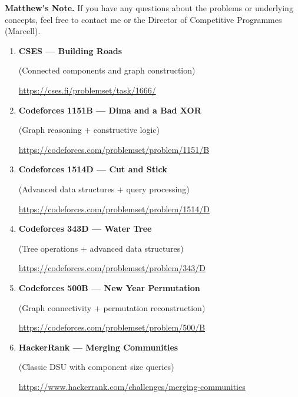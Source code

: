 \documentclass[11pt]{article}
\begin{document}
\medskip

\textbf{Matthew's Note.}  
If you have any questions about the problems or underlying concepts, feel free to contact me or the Director of Competitive Programmes (Marcell).

\vspace{0.8em}

\begin{enumerate}

\item \textbf{CSES — Building Roads}

(Connected components and graph construction)

\vspace{0.3em}
{\small\url{https://cses.fi/problemset/task/1666/}}

\vspace{0.8em}

\item \textbf{Codeforces 1151B — Dima and a Bad XOR}

(Graph reasoning + constructive logic)

\vspace{0.3em}
{\small\url{https://codeforces.com/problemset/problem/1151/B}}

\vspace{0.8em}

\item \textbf{Codeforces 1514D — Cut and Stick}

(Advanced data structures + query processing)

\vspace{0.3em}
{\small\url{https://codeforces.com/problemset/problem/1514/D}}

\vspace{0.8em}

\item \textbf{Codeforces 343D — Water Tree}

(Tree operations + advanced data structures)

\vspace{0.3em}
{\small\url{https://codeforces.com/problemset/problem/343/D}}

\vspace{0.8em}

\item \textbf{Codeforces 500B — New Year Permutation}

(Graph connectivity + permutation reconstruction)

\vspace{0.3em}
{\small\url{https://codeforces.com/problemset/problem/500/B}}

\vspace{0.8em}

\item \textbf{HackerRank — Merging Communities}

(Classic DSU with component size queries)

\vspace{0.3em}
{\small\url{https://www.hackerrank.com/challenges/merging-communities}}

\end{enumerate}
\end{document}

